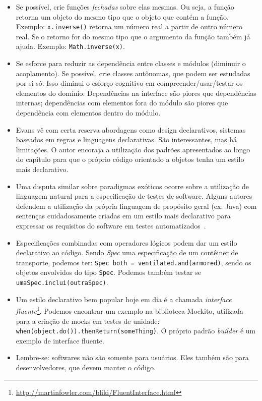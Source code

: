 \documentclass[a4paper, 12pt]{article}
\newcommand{\code}[1]{\texttt{#1}}
\begin{document}
\begin{itemize}
\item Se possível, crie funções \emph{fechadas} sobre elas mesmas. Ou seja, a função retorna um objeto do mesmo tipo que o objeto que contém a função. Exemplo: \code{x.inverse()} retorna um número real a partir de outro número real. Se o retorno for do mesmo tipo que o argumento da função também já ajuda. Exemplo: \code{Math.inverse(x)}.

\item Se esforce para reduzir as dependência entre classes e módulos (diminuir o acoplamento). Se possível, crie classes autônomas, que podem ser estudadas por si só. Isso diminui o esforço cognitivo em compreender/usar/testar os elementos do domínio. Dependências na interface são piores que dependências internas; dependências com elementos fora do módulo são piores que dependência com elementos dentro do módulo.

\item Evans vê com certa reserva abordagens como design declarativos, sistemas baseados em regras e linguagens declarativas. São interessantes, mas há limitações. O autor encoraja a utilização dos padrões apresentados ao longo do capítulo para que o próprio código orientado a objetos tenha um estilo mais declarativo. 

\item Uma disputa similar sobre paradigmas exóticos ocorre sobre a utilização de linguagem natural para a especificação de testes de software. Alguns autores defendem a utilização da própria linguagem de propósito geral (ex: Java) com sentenças cuidadosamente criadas em um estilo mais declarativo para expressar os requisitos do software em testes automatizados~\cite{Freeman2009Tests}.

\item Especificações combinadas com operadores lógicos podem dar um estilo declarativo ao código. Sendo \emph{Spec} uma especificação de um contêiner de transporte, podemos ter: \code{Spec both = ventilated.and(armored)}, sendo os objetos envolvidos do tipo \code{Spec}. Podemos também testar se \code{umaSpec.inclui(outraSpec)}. 

\item Um estilo declarativo bem popular hoje em dia é a chamada \emph{interface fluente}\footnote{\url{http://martinfowler.com/bliki/FluentInterface.html}}. Podemos encontrar um exemplo na biblioteca Mockito, utilizada para a criação de mocks em testes de unidade: \code{when(object.do()).thenReturn(someThing)}. O próprio padrão \emph{builder} é um exemplo de interface fluente.

\item Lembre-se: softwares não são somente para usuários. Eles também são para desenvolvedores, que devem manter o código.


\end{itemize}
\end{document}
